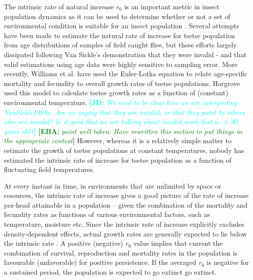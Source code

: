 \documentclass[12pt,a4paper]{article}
\newcommand{\comment}[3]{\textcolor{#1}{\textbf{[#2: }\textsl{#3}\textbf{]}}}
\newcommand{\jd}[1]{\comment{cyan}{JD}{#1}}
\newcommand{\eb}[2]{\comment{green}{EBA}{#1}}
\begin{document}
The intrinsic rate of natural increase $r_0$ is an important metric in insect population dynamics as it can be used to determine whether or not a set of environmental condition is suitable for an insect population \cite{Birch1948}. Several attempts have been made to estimate the natural rate of increase for tsetse population from age distributions of samples of field caught flies, but these efforts largely dissipated following Van Sickle’s \cite{VanSickle1988a} demonstration that they were invalid - and that valid estimations using age data were highly sensitive to sampling error. More recently, Williams et al. \cite{williams1990tsetse} have used the Euler-Lotka equation to relate age-specific mortality and fecundity to overall growth rates of tsetse populations. Hargrove \cite{Hargrove2004a}  used this model to calculate tsetse growth rates as a function of (constant) environmental temperature. \jd{We need to be clear how we are interpreting VanSickle1988a. Are we saying that they are invalid, or that they point to others who are invalid? Is it good that we are talking about invalid work that is $>30$ years old?} \eb{point well taken. Have rewritten this section to put things in the appropriate context}. However, whereas it is a relatively simple matter to estimate the growth of tsetse populations at constant temperatures, nobody has estimated the intrinsic rate of increase for tsetse population as a function of fluctuating field temperatures.

At every instant in time, in environments that are unlimited by space or  resources, the intrinsic rate of increase gives a good picture of the rate of increase per-head  attainable in a population -- given the combination of  the mortality and fecundity rates as functions of various environmental factors, such as temperature, moisture etc. Since the intrinsic rate of increase explicitly excludes density-dependent effects, actual growth rates are generally expected to lie below the intrinsic rate \cite{Birch1948}. A positive (negative) $r_0$ value implies that current the combination of survival, reproduction and  mortality rates in the population is favourable (unfavorable) for positive persistence. If the averaged $r_0$ is negative for a sustained period, the population is expected to go extinct go extinct.
\end{document}
